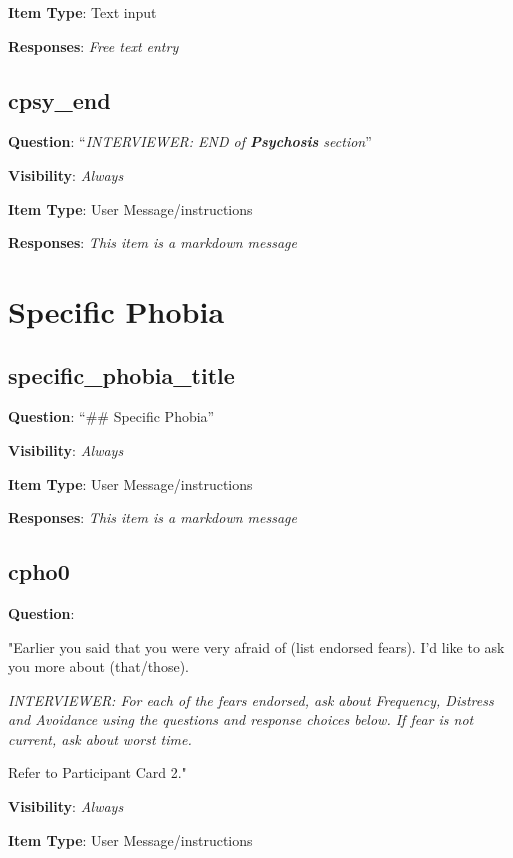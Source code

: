 \documentclass[]{book}
\begin{document}
\textbf{Item Type}: Text input

\textbf{Responses}: \emph{Free text entry}

\hypertarget{cpsy_end}{%
\section{cpsy\_end}\label{cpsy_end}}

\textbf{Question}: ``\emph{INTERVIEWER: END of \textbf{Psychosis} section}''

\textbf{Visibility}: \emph{Always}

\textbf{Item Type}: User Message/instructions

\textbf{Responses}: \emph{This item is a markdown message}

\hypertarget{specific_phobia_section}{%
\chapter{Specific Phobia}\label{specific_phobia_section}}

\hypertarget{specific_phobia_title}{%
\section{specific\_phobia\_title}\label{specific_phobia_title}}

\textbf{Question}: ``\#\# Specific Phobia''

\textbf{Visibility}: \emph{Always}

\textbf{Item Type}: User Message/instructions

\textbf{Responses}: \emph{This item is a markdown message}

\hypertarget{cpho0}{%
\section{cpho0}\label{cpho0}}

\textbf{Question}:

"Earlier you said that you were very afraid of (list endorsed fears). I'd like to ask you more about (that/those).

\emph{INTERVIEWER: For each of the fears endorsed, ask about Frequency, Distress and Avoidance using the questions and response choices below. If fear is not current, ask about worst time.}

Refer to Participant Card 2."

\textbf{Visibility}: \emph{Always}

\textbf{Item Type}: User Message/instructions
\end{document}
